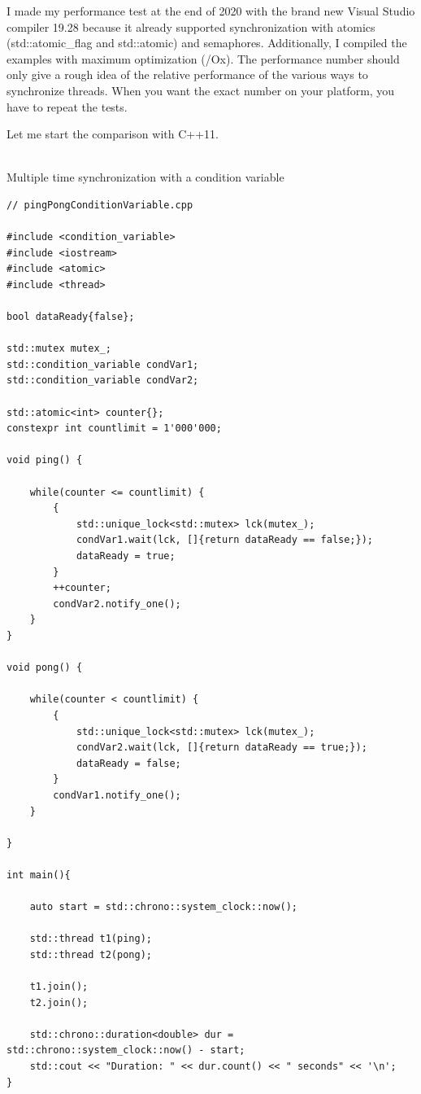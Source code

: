 \begin{tcolorbox}[breakable,enhanced jigsaw,colback=blue!5!white,colframe=blue!75!black,title={About the Numbers}]
I made my performance test at the end of 2020 with the brand new Visual Studio compiler 19.28 because it already supported synchronization with atomics (std::atomic\_flag and std::atomic) and semaphores. Additionally, I compiled the examples with maximum optimization (/Ox). The performance number should only give a rough idea of the relative performance of the various ways to synchronize threads. When you want the exact number on your platform, you have to repeat the tests.
\end{tcolorbox}

Let me start the comparison with C++11.


\hspace*{\fill} \\ %
\noindent
Multiple time synchronization with a condition variable
\begin{lstlisting}[style=styleCXX]
// pingPongConditionVariable.cpp

#include <condition_variable>
#include <iostream>
#include <atomic>
#include <thread>

bool dataReady{false};

std::mutex mutex_;
std::condition_variable condVar1;
std::condition_variable condVar2;

std::atomic<int> counter{};
constexpr int countlimit = 1'000'000;

void ping() {

	while(counter <= countlimit) {
		{
			std::unique_lock<std::mutex> lck(mutex_);
			condVar1.wait(lck, []{return dataReady == false;});
			dataReady = true;
		}
		++counter;
		condVar2.notify_one();
	}
}

void pong() {

	while(counter < countlimit) {
		{
			std::unique_lock<std::mutex> lck(mutex_);
			condVar2.wait(lck, []{return dataReady == true;});
			dataReady = false;
		}
		condVar1.notify_one();
	}

}

int main(){

	auto start = std::chrono::system_clock::now();
	
	std::thread t1(ping);
	std::thread t2(pong);
	
	t1.join();
	t2.join();
	
	std::chrono::duration<double> dur = std::chrono::system_clock::now() - start;
	std::cout << "Duration: " << dur.count() << " seconds" << '\n';
}
\end{lstlisting}

